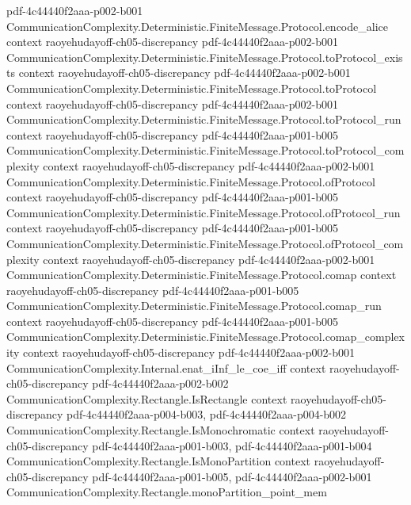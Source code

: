 \begin{theorem}
  {pdf-4c44440f2aaa-p002-b001}
\proofstep
  {CommunicationComplexity.Deterministic.FiniteMessage.Protocol.encode_alice}
  {context}
  {raoyehudayoff-ch05-discrepancy}
  {pdf-4c44440f2aaa-p002-b001}
\proofstep
  {CommunicationComplexity.Deterministic.FiniteMessage.Protocol.toProtocol_exists}
  {context}
  {raoyehudayoff-ch05-discrepancy}
  {pdf-4c44440f2aaa-p002-b001}
\proofstep
  {CommunicationComplexity.Deterministic.FiniteMessage.Protocol.toProtocol}
  {context}
  {raoyehudayoff-ch05-discrepancy}
  {pdf-4c44440f2aaa-p002-b001}
\proofstep
  {CommunicationComplexity.Deterministic.FiniteMessage.Protocol.toProtocol_run}
  {context}
  {raoyehudayoff-ch05-discrepancy}
  {pdf-4c44440f2aaa-p001-b005}
\proofstep
  {CommunicationComplexity.Deterministic.FiniteMessage.Protocol.toProtocol_complexity}
  {context}
  {raoyehudayoff-ch05-discrepancy}
  {pdf-4c44440f2aaa-p002-b001}
\proofstep
  {CommunicationComplexity.Deterministic.FiniteMessage.Protocol.ofProtocol}
  {context}
  {raoyehudayoff-ch05-discrepancy}
  {pdf-4c44440f2aaa-p001-b005}
\proofstep
  {CommunicationComplexity.Deterministic.FiniteMessage.Protocol.ofProtocol_run}
  {context}
  {raoyehudayoff-ch05-discrepancy}
  {pdf-4c44440f2aaa-p001-b005}
\proofstep
  {CommunicationComplexity.Deterministic.FiniteMessage.Protocol.ofProtocol_complexity}
  {context}
  {raoyehudayoff-ch05-discrepancy}
  {pdf-4c44440f2aaa-p002-b001}
\proofstep
  {CommunicationComplexity.Deterministic.FiniteMessage.Protocol.comap}
  {context}
  {raoyehudayoff-ch05-discrepancy}
  {pdf-4c44440f2aaa-p001-b005}
\proofstep
  {CommunicationComplexity.Deterministic.FiniteMessage.Protocol.comap_run}
  {context}
  {raoyehudayoff-ch05-discrepancy}
  {pdf-4c44440f2aaa-p001-b005}
\proofstep
  {CommunicationComplexity.Deterministic.FiniteMessage.Protocol.comap_complexity}
  {context}
  {raoyehudayoff-ch05-discrepancy}
  {pdf-4c44440f2aaa-p002-b001}
\proofstep
  {CommunicationComplexity.Internal.enat_iInf_le_coe_iff}
  {context}
  {raoyehudayoff-ch05-discrepancy}
  {pdf-4c44440f2aaa-p002-b002}
\proofstep
  {CommunicationComplexity.Rectangle.IsRectangle}
  {context}
  {raoyehudayoff-ch05-discrepancy}
  {pdf-4c44440f2aaa-p004-b003,
    pdf-4c44440f2aaa-p004-b002}
\proofstep
  {CommunicationComplexity.Rectangle.IsMonochromatic}
  {context}
  {raoyehudayoff-ch05-discrepancy}
  {pdf-4c44440f2aaa-p001-b003,
    pdf-4c44440f2aaa-p001-b004}
\proofstep
  {CommunicationComplexity.Rectangle.IsMonoPartition}
  {context}
  {raoyehudayoff-ch05-discrepancy}
  {pdf-4c44440f2aaa-p001-b005,
    pdf-4c44440f2aaa-p002-b001}
\proofstep
  {CommunicationComplexity.Rectangle.monoPartition_point_mem}

\end{theorem}
